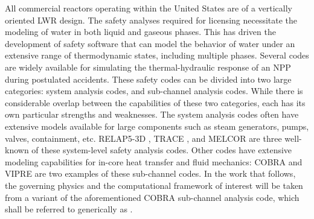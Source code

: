 All commercial reactors operating within the United States are of a vertically oriented LWR design.
The safety analyses required for licensing necessitate the modeling of water in both liquid and gaseous phases.
This has driven the development of safety software that can model the behavior of water under an extensive range of thermodynamic states, including multiple phases.
Several codes are widely available for simulating the thermal-hydraulic response of an NPP during postulated accidents.
These safety codes can be divided into two large categories: system analysis codes, and sub-channel analysis codes.
While there is considerable overlap between the capabilities of these two categories, each has its own particular strengths and weaknesses.
The system analysis codes often have extensive models available for large components such as steam generators, pumps, valves, containment, etc.
RELAP5-3D \cite{RELAP}, TRACE \cite{TRACE}, and MELCOR \cite{Summers1994} are three well-known of these system-level safety analysis codes.
Other codes have extensive modeling capabilities for in-core heat transfer and fluid mechanics: COBRA \cite{Thurgood1983c} and VIPRE are two examples of these sub-channel codes.
In the work that follows, the governing physics and the computational framework of interest will be taken from a variant of the aforementioned COBRA sub-channel analysis code, which shall be referred to generically as \cobra{}.
